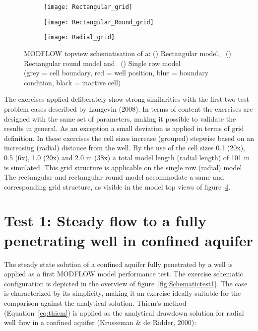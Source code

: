 \begin{figure}[H]
	\centering
	\begin{subfigure}[b]{0.5\linewidth}
		\centering\texttt{[image: Rectangular\_grid]}
		\captionsetup{justification=centering}		
		\caption{\label{fig:Rectangular model}}
		\end{subfigure}%
	\begin{subfigure}[b]{0.5\linewidth}
        \centering\texttt{[image: Rectangular\_Round\_grid]}
		\captionsetup{justification=centering}		
		\caption{\label{fig:Rectangular round model}}
		\end{subfigure}
	\begin{subfigure}[b]{\linewidth}
        \centering\texttt{[image: Radial\_grid]}
		\captionsetup{justification=centering}		
		\caption{\label{fig:Single row model}}
		\end{subfigure}
	\captionsetup{justification=centering}	
	\caption[Modflow topview schematisation of a: () Rectangular model, ~() Rectangular round model and ~() Single row model]{MODFLOW topview schematisation of a: () Rectangular model, ~() Rectangular round model and ~() Single row model \\ (grey = cell boundary, red = well position, blue = boundary condition, black = inactive cell)} 
	\label{fig:Modflowtopview}
\end{figure} 
The exercises applied deliberately show strong similarities with the first two test problem cases described by Langevin (2008). In terms of content the exercises are designed with the same set of parameters, making it possible to validate the results in general. As an exception a small deviation is applied in terms of grid definition. In these exercises the cell sizes increase (grouped) stepwise based on an increasing (radial) distance from the well. By the use of the cell sizes 0.1 (20x), 0.5 (6x), 1.0 (20x) and 2.0 m (38x) a total model length (radial length) of 101 m is simulated. This grid structure is applicable on the single row (radial) model. The rectangular and rectangular round model accommodate a same and corresponding grid structure, as visible in the model top views of figure~\ref{fig:Modflowtopview}.   

\clearpage\section{Test 1: Steady flow to a fully penetrating well in confined aquifer}
\label{sec:test1}
The steady state solution of a confined aquifer fully penetrated by a well is applied as a first MODFLOW model performance test. The exercise schematic configuration is depicted in the overview of figure~\ref{fig:Schematictest1}. The case is characterized by its simplicity, making it an exercise ideally suitable for the comparison against the analytical solution. Thiem's method (Equation~\ref{eq:thiem}) is applied as the analytical drawdown solution for radial well flow in a confined aquifer (Krusseman \& de Ridder, 2000):

